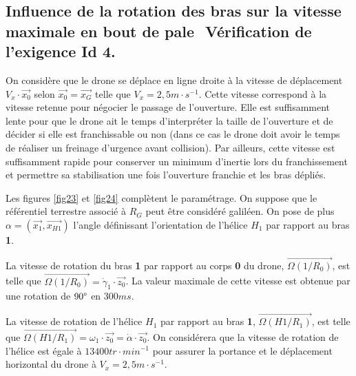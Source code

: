 \subsection{Influence de la rotation des bras sur la vitesse maximale en bout de pale ­ Vérification de l'exigence Id 4.}

On considère que le drone se déplace en ligne droite à la vitesse de déplacement $V_x\cdot \vec{x_0}$ selon $\vec{x_0}=\vec{x_G}$ telle que $V_x=2,5m\cdot s^{-1}$. Cette vitesse correspond à la vitesse retenue pour négocier
le passage de l'ouverture. Elle est suffisamment lente pour que le drone ait le temps d'interpréter la taille de l'ouverture et de décider si elle est franchissable ou non (dans ce cas le drone doit avoir le temps de réaliser un freinage d'urgence avant collision). Par ailleurs, cette vitesse est suffisamment rapide pour conserver un minimum \og d'inertie \fg lors du franchissement et permettre sa stabilisation une fois l'ouverture franchie et les bras dépliés.

Les figures \ref{fig23} et \ref{fig24} complètent le paramétrage. On suppose que le référentiel terrestre associé à $R_G$ peut être considéré galiléen. On pose de plus $\alpha=(\vec{x_1},\vec{x_{H1}})$ l'angle définissant l'orientation de l'hélice \textbf{$H_1$} par rapport au bras \textbf{1}.

La vitesse de rotation du bras \textbf{1} par rapport au corps \textbf{0} du drone, $\overrightarrow{\Omega(1/R_0)}$, est telle que $\overrightarrow{\Omega(1/R_0)}=\dot{\gamma}_1\cdot\vec{z_0}$. La valeur maximale de cette vitesse est obtenue par une rotation de $90\degree$ en
$300ms$.

La vitesse de rotation de l'hélice \textbf{$H_1$} par rapport au bras \textbf{1}, $\overrightarrow{\Omega(H1/R_1)}$, est telle que $\overrightarrow{\Omega(H1/R_1)}=\omega_1\cdot \vec{z_0}=\dot{\alpha}\cdot\vec{z_0}$. On considérera que la vitesse de rotation de l'hélice est égale à $13400tr\cdot min^{-1}$ pour assurer la portance et le déplacement horizontal du drone à $V_x=2,5m\cdot s^{-1}$.



